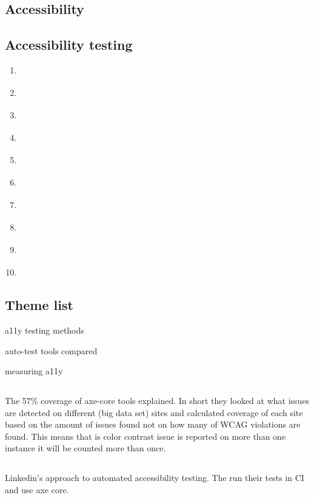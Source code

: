 \documentclass{master_thesis}
\begin{document}
\subsection*{Accessibility}
\subsection*{Accessibility testing}
\begin{enumerate}
	\item \cite{DequeSystems2021}
	\item \cite{AbouZahra2017}
	\item \cite{Sane2021}
	\item \cite{Thornton2022}
	\item \cite{RybinKoob2022}
	\item \cite{Ismailova2022}
	\item \cite{CampoverdeMolina2021}
	\item \cite{Kumar2020}
	\item \cite{Kumar2021}
	\item \cite{Seetha2022}
\end{enumerate}

\subsection*{Theme list}
\begin{list}{-}{}
	\item a11y testing methods
	\item auto-test tools compared
	\item measuring a11y
\end{list}

\subsection*{\cite{DequeSystems2021report}}
The 57\% coverage of axe-core tools explained. In short they looked at what issues are detected on different (big data set) sites and calculated coverage of each site based on the amount of issues found not on how many of WCAG violations are found. This means that is color contrast issue is reported on more than one instance it will be counted more than once.
\subsection*{\cite{Tse2020}}
Linkedin's approach to automated accessibility testing. The run their tests in CI and use axe core.
\end{document}
